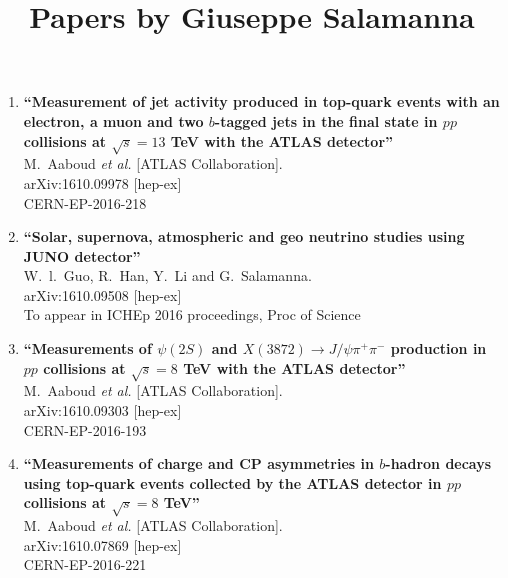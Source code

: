 \documentclass{article}
\begin{document}
\title{Papers by Giuseppe Salamanna}
\author{}
\date{}
\maketitle
\begin{enumerate}

\item%
{\bf ``Measurement of jet activity produced in top-quark events with an electron, a muon and two $b$-tagged jets in the final state in $pp$ collisions at $\sqrt{s}=13$ TeV with the ATLAS detector''}
  \\{}M.~Aaboud {\it et al.} [ATLAS Collaboration].
  \\{}arXiv:1610.09978 [hep-ex]
  \\{}CERN-EP-2016-218

\item%
{\bf ``Solar, supernova, atmospheric and geo neutrino studies using JUNO detector''}
  \\{}W.~l.~Guo, R.~Han, Y.~Li and G.~Salamanna.
  \\{}arXiv:1610.09508 [hep-ex]
  \\{}To appear in ICHEp 2016 proceedings, Proc of Science

\item%
{\bf ``Measurements of $\psi(2S)$ and $X(3872) \to J/\psi\pi^+\pi^-$ production in $pp$ collisions at $\sqrt{s} = 8$ TeV with the ATLAS detector''}
  \\{}M.~Aaboud {\it et al.} [ATLAS Collaboration].
  \\{}arXiv:1610.09303 [hep-ex]
  \\{}CERN-EP-2016-193

\item%
{\bf ``Measurements of charge and CP asymmetries in $b$-hadron decays using top-quark events collected by the ATLAS detector in $pp$ collisions at $\sqrt{s}=8$ TeV''}
  \\{}M.~Aaboud {\it et al.} [ATLAS Collaboration].
  \\{}arXiv:1610.07869 [hep-ex]
  \\{}CERN-EP-2016-221


\end{enumerate}
\end{document}
